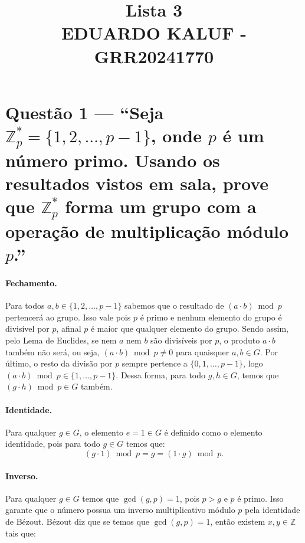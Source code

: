 \documentclass[11pt,a4paper]{article}
\title{Lista 3 \\ EDUARDO KALUF - GRR20241770}
\author{}
\date{}
\newcommand{\Z}{\mathbb{Z}}
\begin{document}
    \maketitle

    \section*{Questão 1 --- ``Seja $\Z_p^* = \{1, 2, \ldots, p-1\}$, onde $p$ é um
    número primo. Usando os resultados vistos em sala, prove que $\Z_p^*$ forma um
    grupo com a operação de multiplicação módulo $p$.''}

    \paragraph{Fechamento.}
    Para todos $a, b \in \{1, 2, \ldots, p-1\}$ sabemos que o resultado
    de $(a \cdot b) \bmod p$ pertencerá ao grupo. Isso vale pois $p$ é primo e nenhum elemento
    do grupo é divisível por $p$, afinal $p$ é maior que qualquer elemento do grupo. Sendo assim,
    pelo Lema de Euclides, se nem $a$ nem $b$ são divisíveis por $p$, o produto $a \cdot b$
    também não será, ou seja, $(a \cdot b) \bmod p \neq 0$ para quaisquer $a, b \in G$.
    Por último, o resto da divisão por $p$ sempre pertence a $\{0, 1, \ldots, p-1\}$, logo
    $(a \cdot b) \bmod p \in \{1, \ldots, p-1\}$.
    Dessa forma, para todo $g, h \in G$, temos que $(g \cdot h) \bmod p \in G$ também.

    \paragraph{Identidade.} Para qualquer $g \in G$, o elemento $e = 1 \in G$ é definido como o elemento
    identidade, pois para todo $g \in G$ temos que:
    \[
        (g \cdot 1) \bmod p = g = (1 \cdot g) \bmod p.
    \]

    \paragraph{Inverso.}
    Para qualquer $g \in G$ temos que $\gcd(g, p) = 1$, pois $p > g$ e $p$ é primo.
    Isso garante que o número possua um inverso multiplicativo módulo $p$
    pela identidade de Bézout.
    Bézout diz que se temos que $\gcd(g, p) = 1$, então existem $x, y \in \Z$ tais que:
\end{document}
